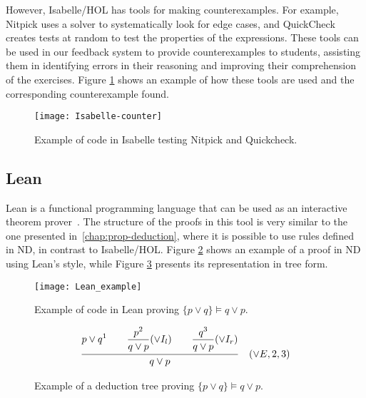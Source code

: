 However, Isabelle/HOL has tools for making counterexamples. For example, Nitpick uses a solver to systematically look for edge cases, and QuickCheck creates tests at random to test the properties of the expressions. These tools can be used in our feedback system to provide counterexamples to students, assisting them in identifying errors in their reasoning and improving their comprehension of the exercises. Figure \ref{img:isabelle-counter} shows an example of how these tools are used and the corresponding counterexample found.
\begin{figure}[htbp]
    \centering
    \texttt{[image: Isabelle-counter]}
    \caption{Example of code in Isabelle testing Nitpick and Quickcheck.}
    \label{img:isabelle-counter}
\end{figure}

\subsection{Lean}
\label{chap:lean}
Lean is a functional programming language that can be used as an interactive theorem prover~\cite{programming}. The structure of the proofs in this tool is very similar to the one presented in~\ref{chap:prop-deduction}, where it is possible to use rules defined in \gls{ND}, in contrast to Isabelle/HOL. Figure \ref{img:lean_example} shows an example of a proof in \gls{ND} using Lean's style, while Figure \ref{tab:lean_example} presents its representation in tree form.

\begin{figure}[htbp]
    \centering
    \texttt{[image: Lean\_example]}
    \caption{Example of code in Lean proving \(\{p \lor q\} \models q \lor p \).}
    \label{img:lean_example}
\end{figure}

\begin{figure}[h!]
    \centering
        \[
            \frac{ {\displaystyle {p \lor q}^1 
            \quad \quad \displaystyle \frac{\displaystyle p^2}{q \lor p \strut} (\lor I_l) \strut}
            \quad \quad \displaystyle \frac{\displaystyle q^3}{q \lor p \strut} (\lor I_r) \strut}
            {\displaystyle q \lor p \strut} \quad (\vee E, 2, 3)
          \]
          \caption{Example of a deduction tree proving \(\{p \lor q\} \models q \lor p \).}
          \label{tab:lean_example}
      \end{figure}

